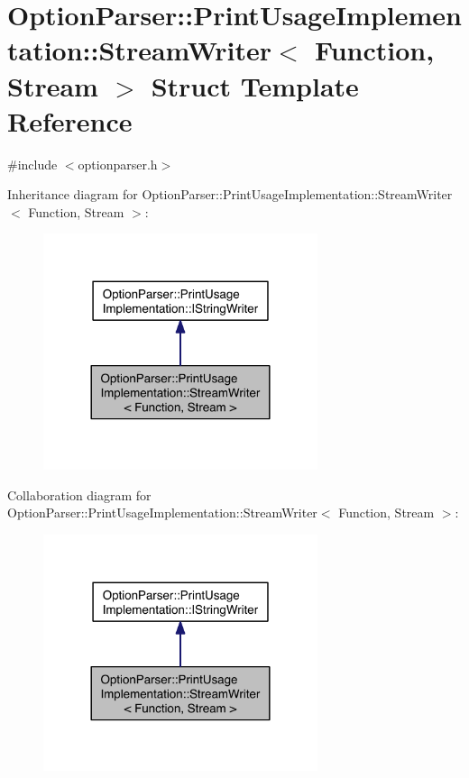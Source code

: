 \hypertarget{struct_option_parser_1_1_print_usage_implementation_1_1_stream_writer}{\section{Option\-Parser\-:\-:Print\-Usage\-Implementation\-:\-:Stream\-Writer$<$ Function, Stream $>$ Struct Template Reference}
\label{struct_option_parser_1_1_print_usage_implementation_1_1_stream_writer}
}


{\ttfamily \#include $<$optionparser.\-h$>$}



Inheritance diagram for Option\-Parser\-:\-:Print\-Usage\-Implementation\-:\-:Stream\-Writer$<$ Function, Stream $>$\-:\nopagebreak
\begin{figure}[H]
\begin{center}
\leavevmode
\includegraphics[width=228pt]{struct_option_parser_1_1_print_usage_implementation_1_1_stream_writer__inherit__graph}
\end{center}
\end{figure}


Collaboration diagram for Option\-Parser\-:\-:Print\-Usage\-Implementation\-:\-:Stream\-Writer$<$ Function, Stream $>$\-:\nopagebreak
\begin{figure}[H]
\begin{center}
\leavevmode
\includegraphics[width=228pt]{struct_option_parser_1_1_print_usage_implementation_1_1_stream_writer__coll__graph}
\end{center}
\end{figure}
